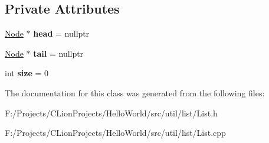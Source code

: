 \subsection*{Private Attributes}
\begin{DoxyCompactItemize}
\item 
\mbox{\label{class_list_a443db628080a04a1dacfd3015d164735}} 
\mbox{\hyperlink{class_node}{Node}} $\ast$ {\bfseries head} = nullptr
\item 
\mbox{\label{class_list_a23467f1903cec0d961114b547fb1fddb}} 
\mbox{\hyperlink{class_node}{Node}} $\ast$ {\bfseries tail} = nullptr
\item 
\mbox{\label{class_list_ac41719eafdd551f0dcee8f3ce67ececc}} 
int {\bfseries size} = 0
\end{DoxyCompactItemize}


The documentation for this class was generated from the following files\+:\begin{DoxyCompactItemize}
\item 
F\+:/\+Projects/\+C\+Lion\+Projects/\+Hello\+World/src/util/list/List.\+h\item 
F\+:/\+Projects/\+C\+Lion\+Projects/\+Hello\+World/src/util/list/List.\+cpp\end{DoxyCompactItemize}
